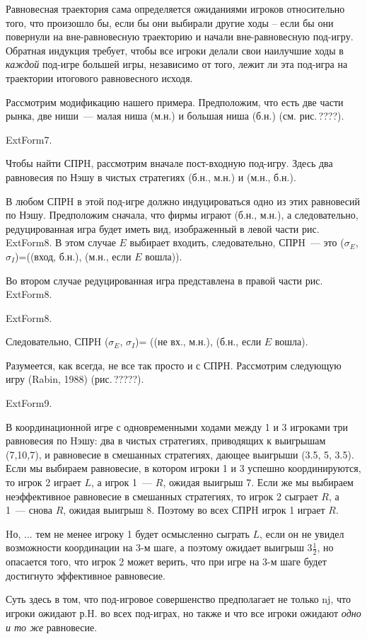 Равновесная траектория сама определяется ожиданиями игроков
относительно того, что произошло бы, если бы они выбирали другие ходы --
если бы они повернули на вне-равновесную траекторию и начали
вне-равновесную под-игру. Обратная индукция требует, чтобы все
игроки делали свои наилучшие ходы в \emph{каждой} под-игре большей игры,
независимо от того, лежит ли эта под-игра на траектории итогового
равновесного исходя.

Рассмотрим модификацию нашего примера. Предположим, что есть две
части рынка, две ниши~--- малая ниша (м.н.) и большая ниша (б.н.)
(см. рис.\,????).


ExtForm7.


Чтобы найти СПРH, рассмотрим вначале пост-входную
под-игру. Здесь два равновесия по Нэшу в чистых стратегиях (б.н.,
м.н.) и (м.н., б.н.).

В любом СПРH в этой под-игре должно индуцироваться одно из этих
равновесий по Нэшу. Предположим сначала, что  фирмы играют (б.н.,
м.н.), а следовательно, редуцированная игра будет иметь вид,
изображенный в левой части рис.\,ExtForm8. В этом случае $E$ выбирает входить,
следовательно, СПРH~--- это ($\sigma_E$, $\sigma_I$)=((вход, б.н.),
(м.н., если $E$ вошла)).

Во втором случае редуцированная игра представлена в правой части рис.\,ExtForm8.


ExtForm8.


Следовательно, СПРH ($\sigma_E$, $\sigma_I$)= ((не вх., м.н.),
(б.н., если $E$ вошла).

Разумеется, как всегда, не все так просто и с СПРH. Рассмотрим
следующую игру (Rabin, 1988) (рис.\,?????).


ExtForm9.



В координационной игре с одновременными ходами между 1 и
3 игроками три равновесия по Hэшу:  два в чистых стратегиях,
приводящих к выигрышам (7,10,7), и равновесие в смешанных
стратегиях, дающее выигрыши (3.5, 5, 3.5). Если мы выбираем
равновесие, в котором игроки 1 и 3 успешно координируются, то игрок
2 играет $L$, а игрок 1~--- $R$, ожидая выигрыш 7. Если же мы
выбираем неэффективное равновесие в смешанных стратегиях, то игрок 2
сыграет $R$, а 1~--- снова $R$, ожидая выигрыш 8. Поэтому во всех
СПРH игрок 1 играет $R$.

Hо, ... тем не менее игроку 1 будет осмысленно сыграть $L$, если он
не
 увидел возможности координации на 3-м шаге, а поэтому ожидает
выигрыш $3\frac{1}{2}$, но опасается того, что игрок 2 может верить,
что при игре на 3-м шаге будет достигнуто эффективное равновесие.

Суть здесь в том, что под-игровое совершенство
предполагает не только nj, что игроки ожидают р.H. во всех под-играх,
но также и что все игроки ожидают {\it одно и то же} равновесие.
